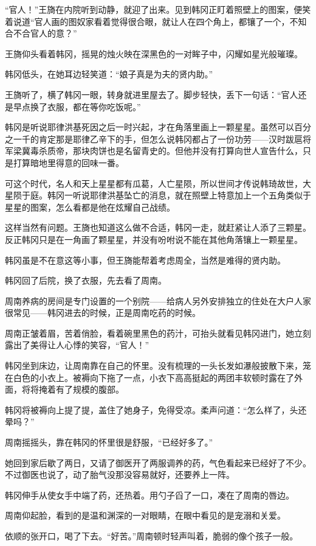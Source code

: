 “官人！”王旖在内院听到动静，就迎了出来。见到韩冈正盯着照壁上的图案，便笑着说道“官人画的图奴家看着觉得很合眼，就让人在四个角上，都镶了一个，不知合不合官人的意？”

王旖仰头看着韩冈，摇晃的烛火映在深黑色的一对眸子中，闪耀如星光般璀璨。

韩冈低头，在她耳边轻笑道：“娘子真是为夫的贤内助。”

王旖听了，横了韩冈一眼，转身就进里屋去了。脚步轻快，丢下一句话：“官人还是早点换了衣服，都在等你吃饭呢。”

韩冈是听说耶律洪基死因之后一时兴起，才在角落里画上一颗星星。虽然可以百分之一千的肯定那是耶律乙辛下的手，但怎么说韩冈都占了一份功劳——汉时跋扈将军梁冀毒杀质帝，那块肉饼也是名留青史的。但他并没有打算向世人宣告什么，只是打算暗地里得意的回味一番。

可这个时代，名人和天上星星都有瓜葛，人亡星陨，所以世间才传说韩琦故世，大星陨于庭。韩冈一听说耶律洪基坠亡的消息，就在照壁上特意加上一个五角类似于星星的图案，怎么看都是他在炫耀自己战绩。

这样当然有问题。王旖也知道这么做不合适，韩冈一走，就赶紧让人添了三颗星。反正韩冈只是在一角画了颗星星，并没有吩咐说不能在其他角落镶上一颗星星。

韩冈虽是不在意这等小事，但王旖能帮着考虑周全，当然是难得的贤内助。

韩冈回了后院，换了衣服，先去看了周南。

周南养病的房间是专门设置的一个别院——给病人另外安排独立的住处在大户人家很常见——韩冈进去的时候，正是周南吃药的时候。

周南正皱着眉，苦着俏脸，看着碗里黑色的药汁，可抬头就看见韩冈进门，她立刻露出了美得让人心悸的笑容，“官人！”

韩冈坐到床边，让周南靠在自己的怀里。没有梳理的一头长发如瀑般披散下来，笼在白色的小衣上。被褥向下拖了一点，小衣下高高挺起的两团丰软顿时露在了外面，将将掩着有了规模的腹部。

韩冈将被褥向上提了提，盖住了她身子，免得受凉。柔声问道：“怎么样了，头还晕吗？”

周南摇摇头，靠在韩冈的怀里很是舒服，“已经好多了。”

她回到家后歇了两日，又请了御医开了两服调养的药，气色看起来已经好了不少。不过御医也说了，动了胎气没那没容易就好，还要养上一阵。

韩冈伸手从使女手中端了药，还热着。用勺子舀了一口，凑在了周南的唇边。

周南仰起脸，看到的是温和渊深的一对眼睛，在眼中看见的是宠溺和关爱。

依顺的张开口，喝了下去。“好苦。”周南顿时轻声叫着，脆弱的像个孩子一般。

